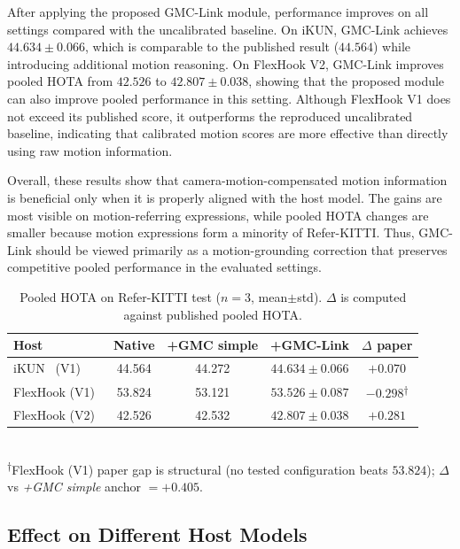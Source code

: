 \documentclass[sigconf,anonymous,nonacm]{acmart}
\begin{document}
After applying the proposed GMC-Link module, performance improves on all settings compared with the uncalibrated baseline. On iKUN, GMC-Link achieves $44.634 \pm 0.066$, which is comparable to the published result ($44.564$) while introducing additional motion reasoning. On FlexHook V2, GMC-Link improves pooled HOTA from $42.526$ to $42.807 \pm 0.038$, showing that the proposed module can also improve pooled performance in this setting. Although FlexHook V1 does not exceed its published score, it outperforms the reproduced uncalibrated baseline, indicating that calibrated motion scores are more effective than directly using raw motion information.

Overall, these results show that camera-motion-compensated motion information is beneficial only when it is properly aligned with the host model. The gains are most visible on motion-referring expressions, while pooled HOTA changes are smaller because motion expressions form a minority of Refer-KITTI. Thus, GMC-Link should be viewed primarily as a motion-grounding correction that preserves competitive pooled performance in the evaluated settings.

\begin{table}[t]
\centering
\caption{Pooled HOTA on Refer-KITTI test ($n{=}3$, mean$\pm$std). $\Delta$ is computed against published pooled HOTA.}
\label{tab:main}
\small
\setlength{\tabcolsep}{4pt}
\begin{tabular}{lcccc}
\toprule
Host & Native & +GMC simple & +GMC-Link & $\Delta$ paper \\
\midrule
iKUN~\cite{ikun} (V1)        & 44.564 & 44.272 & $44.634 \pm 0.066$ & $+0.070$ \\
FlexHook (V1)~\cite{flexhook}  & 53.824 & 53.121 & $53.526 \pm 0.087$ & $-0.298$\textsuperscript{$\dagger$} \\
FlexHook (V2)~\cite{flexhook}  & 42.526 & 42.532 & $42.807 \pm 0.038$ & $+0.281$ \\
\bottomrule
\end{tabular}
\\[2pt]
{\footnotesize \textsuperscript{$\dagger$}FlexHook (V1) paper gap is structural (no tested configuration beats $53.824$); $\Delta$ vs \emph{+GMC simple} anchor $= +0.405$.}
\end{table}

\subsection{Effect on Different Host Models}
\label{sec:deficit}
\end{document}
